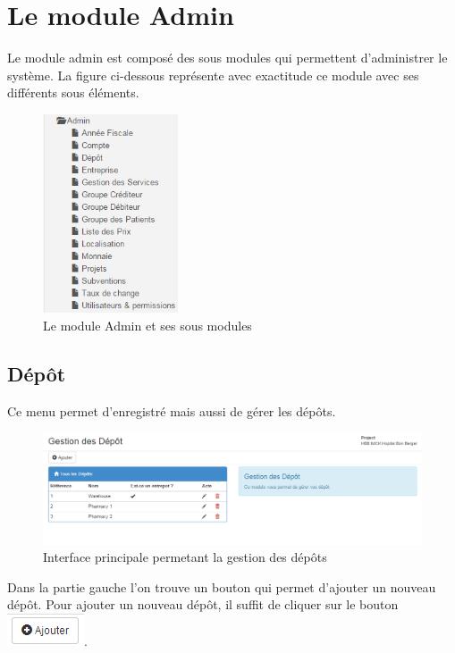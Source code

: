 \documentclass[12pt,a4paper]{report}
\begin{document}
\chapter{Le module Admin}        
Le module admin est composé des sous modules qui permettent d'administrer le système. La figure ci-dessous représente avec exactitude ce module avec ses différents sous éléments.
\begin{figure}[h]
\begin{center}
\includegraphics[width=4cm]{pic/s_admin.png}
\end{center}
\caption{Le module Admin et ses sous modules}
\label{Le module Admin et ses sous menus}
\end{figure} 

\section{Dépôt}
Ce menu permet d'enregistré mais aussi de gérer les dépôts.

\begin{figure}[h]
\begin{center}
\includegraphics[width=14cm]{pic/GestionDesDepot.png}
\end{center}
\caption{Interface principale permetant la gestion des dépôts}
\label{Interface principale permetant la gestion des dépôts}
\end{figure}

Dans la partie gauche l'on trouve un bouton qui permet d'ajouter un nouveau dépôt. Pour ajouter un nouveau dépôt, il suffit de cliquer sur le bouton \includegraphics[scale=0.7]{pic/AddNewStore.png}.
\end{document}
